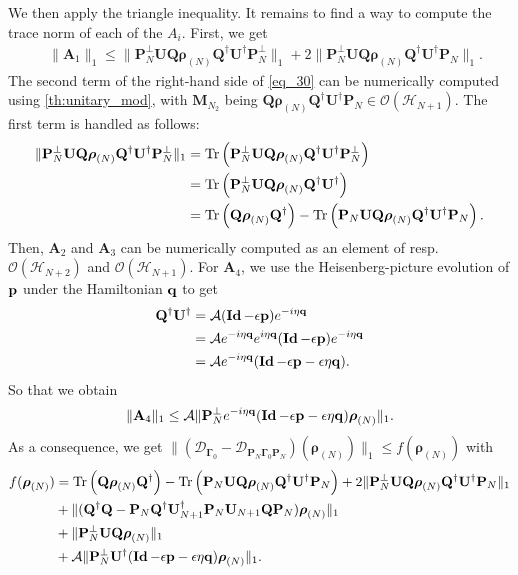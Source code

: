 \documentclass[a4paper,onecolumn,amsmath,amssymb,amsfonts,accepted=2026-03-06]{quantumarticle}
\newcommand{\Id}{\operatorname{\mathbf{Id}}}
\newcommand{\xH}{\mathcal{H}}
\newcommand{\xP}{\mathbf{Q}}
\newcommand{\xtr}[1]{\operatorname{Tr}\left(#1 \right)}
\newcommand{\cD}{\mathcal D}
\newcommand{\LL}{{\mathbf{\Gamma}}}
\newcommand{\Proj}[1]{\mathbf{P}_{#1}}
\newcommand{\cA}{\mathcal A}
\newcommand{\qop}{{\bf q}}
\newcommand{\Pop}{{\bf p}}
\newcommand{\rN}{{\boldsymbol{\rho}_{(N)}}}
\newcommand{\Uop}{\mathbf{U}}
\begin{document}
We then apply the triangle inequality. It remains to find a way to compute the trace norm of each of the $A_i$. 
First, we get
\begin{align}
	\label{eq_30} &
	\|\mathbf{A}_1\|_1 \leq \| \Proj{N}^\perp \Uop \xP \rN \xP^\dagger \Uop^\dag \Proj{N}^\perp\|_1 + 2\| \Proj{N}^\perp \Uop \xP \rN \xP^\dagger \Uop^\dag \Proj{N}\|_1.
\end{align}
The second term of the right-hand side of \cref{eq_30} can be numerically computed using \cref{th:unitary_mod}, with $\mathbf{M}_{N_2}$ being  $\xP \rN \xP^\dagger \Uop^\dag \Proj{N}\in \mathcal{O}(\xH_{N+1})$. The first term is handled as follows:
\begin{align}
	\notag \| \Proj{N}^\perp \Uop \xP \rN \xP^\dagger \Uop^\dag \Proj{N}^\perp\|_1&=\xtr{\Proj{N}^\perp \Uop \xP \rN \xP^\dagger \Uop^\dag \Proj{N}^\perp}\\
	\notag &=\xtr{\Proj{N}^\perp \Uop \xP \rN \xP^\dagger \Uop^\dag}\\
	\notag &=\xtr{\xP \rN \xP^\dagger}- \xtr{\Proj{N} \Uop \xP \rN \xP^\dagger \Uop^\dag \Proj{N}}.
\end{align}
Then, $\mathbf{A}_2$ and $\mathbf{A}_3$ can be numerically computed as an element of resp. $\mathcal{O}(\xH_{N+2})$ and $\mathcal{O}(\xH_{N+1})$. For $\mathbf{A}_4$, we use the Heisenberg-picture evolution of $\Pop$ under the Hamiltonian $\qop$ to get
\begin{align}
	\notag \xP^\dag \Uop^\dag &=\cA(\Id-\epsilon \Pop) e^{-i\eta \qop}\\
	\notag &=\cA e^{-i\eta \qop}e^{i\eta \qop}(\Id-\epsilon \Pop) e^{-i\eta \qop}\\
	&=\cA e^{-i\eta \qop}(\Id-\epsilon \Pop - \epsilon\eta \qop).
\end{align}
So that we obtain  
\begin{align}
	\|\mathbf{A}_4\|_1\leq  \cA\|\Proj{N}^\perp e^{-i\eta \qop}(\Id-\epsilon \Pop - \epsilon \eta \qop)\rN\|_1.
\end{align}
As a consequence, we get $\|(\cD_{\LL_0}-\cD_{\Proj{N} \LL_0 \Proj{N}})(\rN)\|_1\leq f(\rN)$ with
\begin{align}
	\notag f(\rN)&=
	\xtr{\xP \rN \xP^\dagger}- \xtr{\Proj{N} \Uop \xP \rN \xP^\dagger \Uop^\dag \Proj{N}}+ 2\| \Proj{N}^\perp \Uop \xP \rN \xP^\dagger \Uop^\dag \Proj{N}\|_1\\
	\notag &+ \|(\xP^\dagger\xP - \Proj{N}\xP^\dagger \Uop_{N+1}^\dagger \Proj{N} \Uop_{N+1} \xP \Proj{N})\rN\|_1\\
	\notag &+\|\Proj{N}^\perp \Uop \xP \rN\|_1\\
	&+\cA\|\Proj{N}^\perp \Uop^\dag(\Id-\epsilon \Pop-\epsilon \eta \qop)\rN\|_1.
\end{align} 
\end{document}
